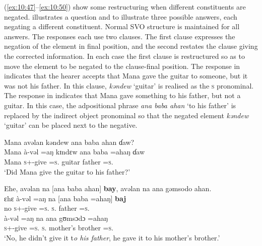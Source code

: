 (\ref{ex:10:47}--\ref{ex:10:50}) show some restructuring when different constituents are negated.  illustrates a question and  to  illustrate three possible answers, each negating a different constituent. Normal SVO structure is maintained for all answers. The responses each use two clauses. The first clause expresses the negation of the element in final position, and the second restates the clause giving the corrected information. In each case the first clause is restructured so as to move the element to be negated to the clause-final position. The response in  indicates that the hearer accepts that Mana gave the guitar to someone, but it was not his father. In this clause, \textit{kəndew} ‘guitar’ is realised as the \textsc{s} \DO pronominal. The response in  indicates that Mana gave something to his father, but not a guitar. In this case, the adpositional phrase \textit{ana baba ahan} ‘to his father’ is replaced by the indirect object pronominal so that the negated element \textit{kəndew} ‘guitar’ can be placed next to the negative. 

\ea \label{ex:10:47}
Mana  avəlan  kəndew  ana  baba  ahan  ɗaw?\\
\gll  Mana  à-vəl =aŋ     kɪndɛw  ana   baba  =ahaŋ    ɗaw\\
      Mana     \textsc{s}+{\PFV}-give =\textsc{s}.{\IO}  guitar  {\DAT} father  =\textsc{s}.{\POSS}  {\QUEST}\\
\glt  ‘Did Mana give the guitar to his father?’
\z

\ea \label{ex:10:48}
Ehe,  avəlan  na  [ana  baba  ahan]  \textbf{bay},  avəlan  na  ana  gəmsodo  ahan.\\
\gll  ɛhɛ à-vəl =aŋ na [ana baba =ahaŋ] \textbf{baj}\\    no    \textsc{s}+{\PFV}-give =\textsc{s}.{\IO}  \textsc{s}.{\DO}  {\DAT} father  =\textsc{s}.{\POSS}  {\NEG}\\ 

      \medskip
\gll à-vəl =aŋ na ana gʊmsɔdɔ =ahaŋ\\
     \textsc{s}+{\PFV}-give =\textsc{s}.{\IO}  \textsc{s}.{\DO} {\DAT} {mother’s brother}  =\textsc{s}.{\POSS} \\
\glt  ‘No, he didn’t give it t\textit{o his father}, he gave it to his mother’s brother.’
\z

